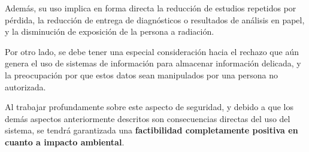    Además, su uso implica en forma directa la reducción de estudios repetidos por pérdida, la reducción de entrega de diagnósticos o resultados de análisis en papel, y la disminución de exposición de la persona a radiación.
    
    Por otro lado, se debe tener una especial consideración hacia el rechazo que aún genera el uso de sistemas de información para almacenar información delicada, y la preocupación por que estos datos sean manipulados por una persona no autorizada.
    
    Al trabajar profundamente sobre este aspecto de seguridad, y debido a que los demás aspectos anteriormente descritos son consecuencias directas del uso del sistema, se tendrá garantizada una \textbf{factibilidad completamente positiva en cuanto a impacto ambiental}.


